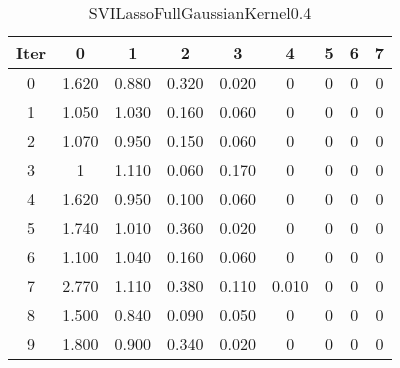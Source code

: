 \begin{table}
	\begin{center}
		\begin{tabular}{|c|c|c|c|c|c|c|c|c|}
			\hline
			Iter & 0 & 1 & 2 & 3 & 4 & 5 & 6 & 7 \\
			\hline
			0 & 1.620 & 0.880 & 0.320 & 0.020 & 0 & 0 & 0 & 0 \\
			\hline
			1 & 1.050 & 1.030 & 0.160 & 0.060 & 0 & 0 & 0 & 0 \\
			\hline
			2 & 1.070 & 0.950 & 0.150 & 0.060 & 0 & 0 & 0 & 0 \\
			\hline
			3 & 1 & 1.110 & 0.060 & 0.170 & 0 & 0 & 0 & 0 \\
			\hline
			4 & 1.620 & 0.950 & 0.100 & 0.060 & 0 & 0 & 0 & 0 \\
			\hline
			5 & 1.740 & 1.010 & 0.360 & 0.020 & 0 & 0 & 0 & 0 \\
			\hline
			6 & 1.100 & 1.040 & 0.160 & 0.060 & 0 & 0 & 0 & 0 \\
			\hline
			7 & 2.770 & 1.110 & 0.380 & 0.110 & 0.010 & 0 & 0 & 0 \\
			\hline
			8 & 1.500 & 0.840 & 0.090 & 0.050 & 0 & 0 & 0 & 0 \\
			\hline
			9 & 1.800 & 0.900 & 0.340 & 0.020 & 0 & 0 & 0 & 0 \\
			\hline
		\end{tabular}
	\end{center}
	\caption{SVILassoFullGaussianKernel0.4}
\end{table}